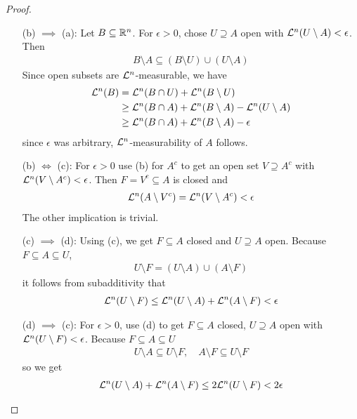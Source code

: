 \begin{proof}
\begin{enumerate}
  \item[(b) $\implies$ (a):] Let $B \subseteq \mathbb{R}^{n}$. 
    For $\epsilon > 0$, chose $U \supseteq A$ open with $\Leb^{n}(U \setminus A) < \epsilon$.
    Then
    \begin{align*}
      B \setminus A \subseteq 
      (B \setminus U) \cup (U \setminus A)
    \end{align*}
    Since open subsets are $\mathcal{L}^{n}$-measurable, we have
    \begin{align*}
      \Leb^{n}(B) 
      &=
      \Leb^{n}(B \cap U) + \Leb^{n}(B \setminus U)\\
      &\geq
      \Leb^{n}(B \cap A) + \Leb^{n}(B \setminus A) - \Leb^{n}(U \setminus A)\\
      &\geq
      \Leb^{n}(B \cap A) + \Leb^{n}(B \setminus A) - \epsilon
    \end{align*}
    since $\epsilon$ was arbitrary, $\mathcal{L}^{n}$-measurability of $A$ follows.


  \item[(b) $\iff$ (c):] For $\epsilon > 0$ use (b) for $A^{c}$ to get an open set $V \supseteq A^{c}$ with
    $\Leb^{n}(V \setminus A^{c}) < \epsilon$.
    Then $F = V^{c} \subseteq A$ is closed and 
    \begin{align*}
      \Leb^{n}(A \setminus V^{c}) = \Leb^{n}(V \setminus A^{c}) < \epsilon
    \end{align*}
    The other implication is trivial.

  \item[(c) $\implies$ (d):] Using (c), we get $F \subseteq A$ closed and $U \supseteq A$ open. 
    Because $F \subseteq A \subseteq U$,
    \begin{align*}
      U \setminus F = (U \setminus A) \cup (A \setminus F) 
    \end{align*}
    it follows from subadditivity that 
    \begin{align*}
      \Leb^{n}(U \setminus F) \leq \Leb^{n}(U \setminus A) + \Leb^{n}(A \setminus F) < \epsilon
    \end{align*}

  \item[(d) $\implies$ (c):] For $\epsilon > 0$, use (d) to get $F \subseteq A$ closed, $U \supseteq A$ open with $\Leb^{n}(U \setminus F) < \epsilon$.
    Because $F \subseteq A \subseteq U$
    \begin{align*}
      U \setminus A \subseteq U \setminus F, \quad A \setminus F \subseteq U \setminus F
    \end{align*}
    so we get
    \begin{align*}
      \Leb^{n}(U \setminus A) + \Leb^{n}(A \setminus F) \leq 2 \Leb^{n}(U \setminus F) < 2 \epsilon
    \end{align*}
\end{enumerate}
\end{proof}



